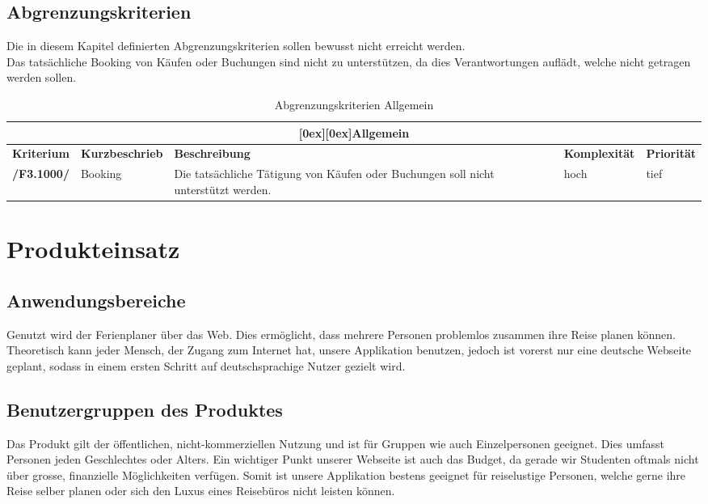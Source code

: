 \documentclass[10pt,a4paper,titlepage,twoside,german,final]{zhawreprt}
\newcommand{\AddRequirement}[2]{
\textbf{/#1#2/}
}
\newcommand{\D}[1]{
\AddRequirement{F3.}{#1}
}
\newcommand{\tableheader}[2]{\multicolumn{#1}{c}{\raisebox{-0.3em}[0ex][0ex]{\large{\textbf{#2}}}}}
\numberwithin{table}{chapter}
\begin{document}
\section{Abgrenzungskriterien}\label{sec:DistinctionCriteria}
Die in diesem Kapitel definierten Abgrenzungskriterien sollen bewusst nicht erreicht werden.\\
Das tatsächliche Booking von Käufen oder Buchungen sind nicht zu unterstützen, da dies Verantwortungen auflädt, welche nicht getragen werden sollen.
\begin{table}[ht]\centering
\begin{tabular}{l|p{2.5cm}|p{5cm}|p{2cm}|p{1.5cm}}\hline
\tableheader{5}{Allgemein}\\[0.3em]\hline
\textbf{Kriterium} & \textbf{Kurzbeschrieb} & \textbf{Beschreibung} & \textbf{Komplexität} & \textbf{Priorität}\\\hline
\D{1000} & Booking & Die tatsächliche Tätigung von Käufen oder Buchungen soll nicht unterstützt werden. & hoch & tief\\\hline
\end{tabular}
\caption{Abgrenzungskriterien Allgemein}\label{tbl:DistinctionGeneral}
\end{table}
\chapter{Produkteinsatz}\label{chp:ProductApplication}
\section{Anwendungsbereiche}\label{sec:FieldOfApplience}
Genutzt wird der Ferienplaner über das Web. Dies ermöglicht, dass mehrere Personen problemlos zusammen ihre Reise planen können.\\
Theoretisch kann jeder Mensch, der Zugang zum Internet hat, unsere Applikation benutzen, jedoch ist vorerst nur eine deutsche Webseite geplant, sodass in einem ersten Schritt auf deutschsprachige Nutzer gezielt wird.
\section{Benutzergruppen des Produktes}\label{sec:TargetAudience}
Das Produkt gilt der öffentlichen, nicht-kommerziellen Nutzung und ist für Gruppen wie auch Einzelpersonen geeignet. Dies umfasst Personen jeden Geschlechtes oder Alters. Ein wichtiger Punkt unserer Webseite ist auch das Budget, da gerade wir Studenten oftmals nicht über grosse, finanzielle Möglichkeiten verfügen. Somit ist unsere Applikation bestens geeignet für reiselustige Personen, welche gerne ihre Reise selber planen oder sich den Luxus eines Reisebüros nicht leisten können.
\end{document}
